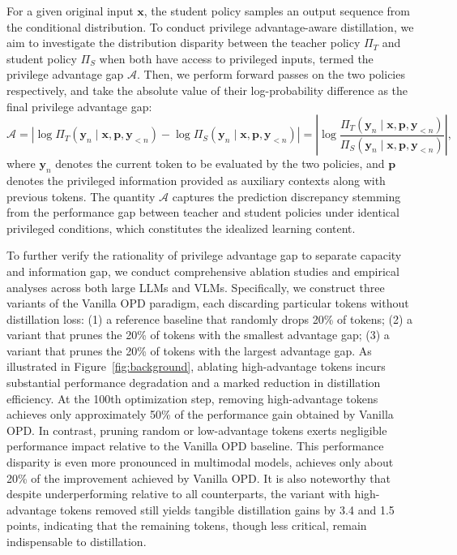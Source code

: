 \documentclass{llmxive}
\begin{document}
For a given original input $\mathbf{x}$, the student policy samples an output sequence from the conditional distribution. 
To conduct privilege advantage-aware distillation, we aim to investigate the distribution disparity between the teacher policy $\Pi_{T}$ and student policy $\Pi_{S}$ when both have access to privileged inputs, termed the privilege advantage gap $\mathcal{A}$. Then, we perform forward passes on the two policies respectively, and take the absolute value of their log-probability difference as the final privilege advantage gap:
\begin{equation}
    \mathcal{A} = | \log \Pi_{T} \left(\mathbf{y}_{n} \mid \mathbf{x} , \mathbf{p} , \mathbf{y}_{<n}\right)-\log \Pi_{S}\left(\mathbf{y}_{n} \mid \mathbf{x}, \mathbf{p}, \mathbf{y}_{<n}\right)| = \left|\log\frac{  \Pi_{T} \left(\mathbf{y}_{n} \mid \mathbf{x} , \mathbf{p} , \mathbf{y}_{<n}\right)}{ \Pi_{S}\left(\mathbf{y}_{n} \mid \mathbf{x}, \mathbf{p}, \mathbf{y}_{<n}\right)}\right|,
    \label{eq:advantage_gap}
\end{equation}
where $\mathbf{y}_{n}$ denotes the current token to be evaluated by the two policies, and $\mathbf{p}$ denotes the privileged information provided as auxiliary contexts along with previous tokens. 
The quantity $\mathcal{A}$ captures the prediction discrepancy stemming from the performance gap between teacher and student policies under identical privileged conditions, which constitutes the idealized learning content.


To further verify the rationality of privilege advantage gap to separate capacity and information gap, we conduct comprehensive ablation studies and empirical analyses across both large LLMs and VLMs. Specifically, we construct three variants of the Vanilla OPD paradigm, each discarding particular tokens without distillation loss: (1) a reference baseline that randomly drops 20\% of tokens; (2) a variant that prunes the 20\% of tokens with the smallest advantage gap; (3) a variant that prunes the 20\% of tokens with the largest advantage gap.
As illustrated in Figure~\ref{fig:background}, ablating high-advantage tokens incurs substantial performance degradation and a marked reduction in distillation efficiency. At the 100th optimization step, removing high-advantage tokens achieves only approximately 50\% of the performance gain obtained by Vanilla OPD. In contrast, pruning random or low-advantage tokens exerts negligible performance impact relative to the Vanilla OPD baseline. This performance disparity is even more pronounced in multimodal models, achieves only about 20\% of the improvement achieved by Vanilla OPD. It is also noteworthy that despite underperforming relative to all counterparts, the variant with high-advantage tokens removed still yields tangible distillation gains by 3.4 and 1.5 points, indicating that the remaining tokens, though less critical, remain indispensable to distillation.
\end{document}
